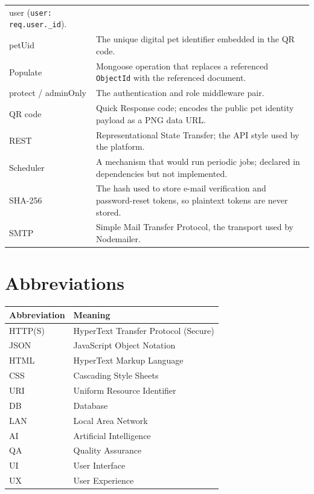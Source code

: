\begin{center}
\begin{longtable}{@{}p{3.4cm}p{11.2cm}@{}}
user (\texttt{user: req.user.\_id}). \\
petUid & The unique digital pet identifier embedded in the QR code. \\
Populate & Mongoose operation that replaces a referenced \texttt{ObjectId} with
the referenced document. \\
protect / adminOnly & The authentication and role middleware pair. \\
QR code & Quick Response code; encodes the public pet identity payload as a PNG
data URL. \\
REST & Representational State Transfer; the API style used by the platform. \\
Scheduler & A mechanism that would run periodic jobs; declared in dependencies
but not implemented. \\
SHA-256 & The hash used to store e-mail verification and password-reset tokens,
so plaintext tokens are never stored. \\
SMTP & Simple Mail Transfer Protocol, the transport used by Nodemailer. \\
\bottomrule
\end{longtable}
\addtocounter{table}{-1}
\end{center}

\section*{Abbreviations}

\begin{center}
\begin{longtable}{@{}p{3.4cm}p{11.2cm}@{}}
\toprule
\textbf{Abbreviation} & \textbf{Meaning} \\
\midrule
HTTP(S) & HyperText Transfer Protocol (Secure) \\
JSON & JavaScript Object Notation \\
HTML & HyperText Markup Language \\
CSS & Cascading Style Sheets \\
URI & Uniform Resource Identifier \\
DB & Database \\
LAN & Local Area Network \\
AI & Artificial Intelligence \\
QA & Quality Assurance \\
UI & User Interface \\
UX & User Experience \\
\bottomrule
\end{longtable}
\addtocounter{table}{-1}
\end{center}